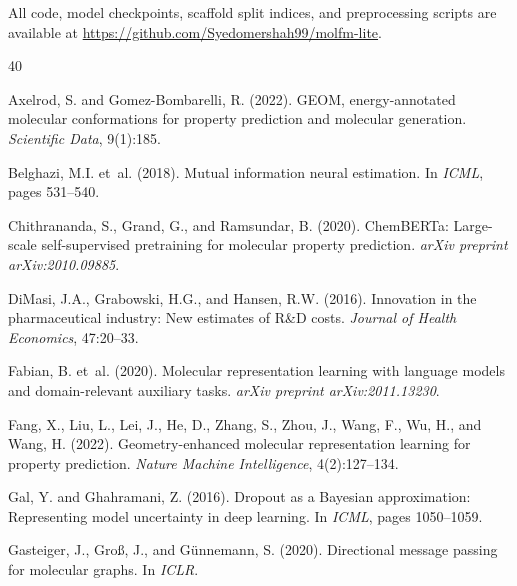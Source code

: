 \documentclass[11pt]{article}
\begin{document}
All code, model checkpoints, scaffold split indices, and preprocessing scripts are available at \url{https://github.com/Syedomershah99/molfm-lite}.


\begin{thebibliography}{40}

Axelrod, S. and Gomez-Bombarelli, R. (2022).
\newblock GEOM, energy-annotated molecular conformations for property prediction and molecular generation.
\newblock \emph{Scientific Data}, 9(1):185.

Belghazi, M.I. et~al. (2018).
\newblock Mutual information neural estimation.
\newblock In \emph{ICML}, pages 531--540.

Chithrananda, S., Grand, G., and Ramsundar, B. (2020).
\newblock ChemBERTa: Large-scale self-supervised pretraining for molecular property prediction.
\newblock \emph{arXiv preprint arXiv:2010.09885}.

DiMasi, J.A., Grabowski, H.G., and Hansen, R.W. (2016).
\newblock Innovation in the pharmaceutical industry: New estimates of R\&D costs.
\newblock \emph{Journal of Health Economics}, 47:20--33.

Fabian, B. et~al. (2020).
\newblock Molecular representation learning with language models and domain-relevant auxiliary tasks.
\newblock \emph{arXiv preprint arXiv:2011.13230}.

Fang, X., Liu, L., Lei, J., He, D., Zhang, S., Zhou, J., Wang, F., Wu, H., and Wang, H. (2022).
\newblock Geometry-enhanced molecular representation learning for property prediction.
\newblock \emph{Nature Machine Intelligence}, 4(2):127--134.

Gal, Y. and Ghahramani, Z. (2016).
\newblock Dropout as a Bayesian approximation: Representing model uncertainty in deep learning.
\newblock In \emph{ICML}, pages 1050--1059.

Gasteiger, J., Gro\ss{}, J., and G{\"u}nnemann, S. (2020).
\newblock Directional message passing for molecular graphs.
\newblock In \emph{ICLR}.


\end{thebibliography}
\end{document}
